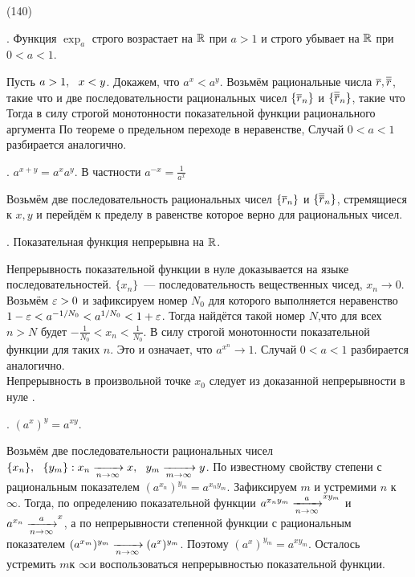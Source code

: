 (140)

. Функция $\exp_a$ строго возрастает на $\mathbb{R}$ при $a > 1$ и строго убывает на $\mathbb{R}$ при $0 < a < 1$.

\D Пусть $a > 1,\ \  x < y$. Докажем, что $a^x < a^y$. Возьмём рациональные числа $\overline r, \overline{\overline{r}}$, такие что  и две последовательности рациональных чисел $\{\overline r_n\}$ и $\{\overline{\overline{r}}_n\}$, такие что  Тогда в силу строгой монотонности показательной функции рационального аргумента  По теореме о предельном переходе в неравенстве,
 Случай $0 < a < 1$ разбирается аналогично.

. $a^{x + y} = a^x a^y$. В частности $a ^{-x} = \frac 1{a^x}$

\D Возьмём две последовательность рациональных чисел $\{\overline r_n\}$ и $\{\overline{\overline{r}}_n\}$, стремящиеся к $x, y$ и перейдём к пределу в равенстве
 которое верно для рациональных чисел.

. Показательная функция непрерывна на $\mathbb{R}$.

\D Непрерывность показательной функции в нуле доказывается на языке последовательностей. $\{x_n\}$~--- последовательность вещественных чисед, $x_n \to 0$. Возьмём $\varepsilon > 0$ и зафиксируем номер $N_0$ для которого выполняется неравенство $1 - \varepsilon < a^{-1/N_0} < a^{1/N_0} < 1 + \varepsilon$. Тогда найдётся такой номер $N$,что для всех $n > N$ будет $-\frac 1{N_0} < x_n < \frac 1{N_0}$. В силу строгой монотонности показательной функции  для таких $n$. Это и означает, что $a^{x^n} \to 1$. Случай $0 < a < 1$ разбирается аналогично.\\
Непрерывность в произвольной точке $x_0$ следует из доказанной непрерывности в нуле .

. $(a^x)^y = a^{xy}$.

\D Возьмём две последовательности рациональных чисел $\{x_n\},\ \  \{y_m\}: x_n \xrightarrow[n \to \infty]{} x,\ \  y_m \xrightarrow[m \to \infty]{} y$. По известному свойству степени с рациональным показателем $(a^{x_n})^{y_m} = a^{x_n y_m}$. Зафиксируем $m$ и устремими $n$ к $\infty$. Тогда, по определению показательной функции $a^{x_n y_m} \xrightarrow[n \to \infty] a^{xy_m}$ и $a^{x_n} \xrightarrow[n \to\infty] a^x$, а по непрерывности степенной функции с рациональным показателем $(a^{x_m})^{y_m} \xrightarrow[n\to\infty]{} (a^x)^{y_m}$. Поэтому $(a^x)^{y_m} = a^{xy_m}$. Осталось устремить $m$к $\infty$и воспользоваться непрерывностью показательной функции.

